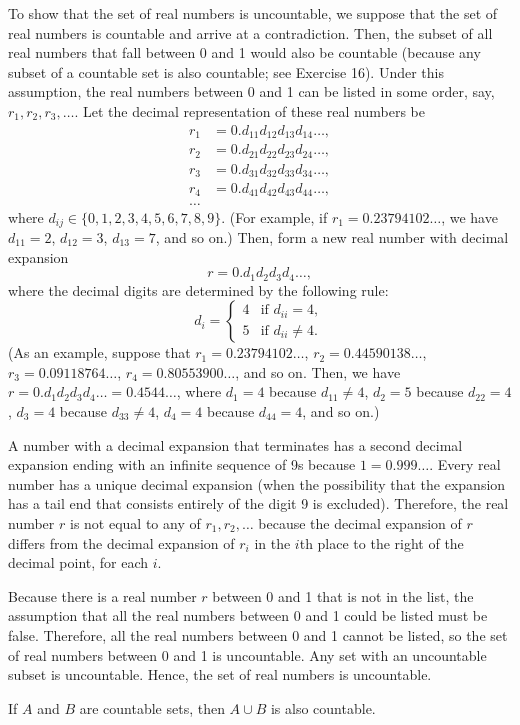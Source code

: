 \begin{thm}

To show that the set of real numbers is uncountable, we suppose that the set of real numbers is countable and arrive at a contradiction. Then, the subset of all real numbers that fall between 0 and 1 would also be countable (because any subset of a countable set is also countable; see Exercise 16). Under this assumption, the real numbers between 0 and 1 can be listed in some order, say, $r_1, r_2, r_3, \ldots$. Let the decimal representation of these real numbers be
\[
\begin{aligned}
    r_1 &= 0.d_{11}d_{12}d_{13}d_{14}\ldots, \\
    r_2 &= 0.d_{21}d_{22}d_{23}d_{24}\ldots, \\
    r_3 &= 0.d_{31}d_{32}d_{33}d_{34}\ldots, \\
    r_4 &= 0.d_{41}d_{42}d_{43}d_{44}\ldots, \\
    \ldots
\end{aligned}
\]
where $d_{ij} \in \{0, 1, 2, 3, 4, 5, 6, 7, 8, 9\}$. (For example, if $r_1 = 0.23794102\ldots$, we have $d_{11} = 2$, $d_{12} = 3$, $d_{13} = 7$, and so on.) Then, form a new real number with decimal expansion
\[
r = 0.d_1d_2d_3d_4\ldots,
\]
where the decimal digits are determined by the following rule:
\[
d_i =
\begin{cases}
    4 & \text{if } d_{ii} = 4, \\
    5 & \text{if } d_{ii} \neq 4.
\end{cases}
\]
(As an example, suppose that $r_1 = 0.23794102\ldots$, $r_2 = 0.44590138\ldots$, $r_3 = 0.09118764\ldots$, $r_4 = 0.80553900\ldots$, and so on. Then, we have $r = 0.d_1d_2d_3d_4\ldots = 0.4544\ldots$, where $d_1 = 4$ because $d_{11} \neq 4$, $d_2 = 5$ because $d_{22} = 4$, $d_3 = 4$ because $d_{33} \neq 4$, $d_4 = 4$ because $d_{44} = 4$, and so on.)

A number with a decimal expansion that terminates has a second decimal expansion ending with an infinite sequence of 9s because $1 = 0.999\ldots$. Every real number has a unique decimal expansion (when the possibility that the expansion has a tail end that consists entirely of the digit 9 is excluded). Therefore, the real number $r$ is not equal to any of $r_1, r_2, \ldots$ because the decimal expansion of $r$ differs from the decimal expansion of $r_i$ in the $i$th place to the right of the decimal point, for each $i$.

Because there is a real number $r$ between 0 and 1 that is not in the list, the assumption that all the real numbers between 0 and 1 could be listed must be false. Therefore, all the real numbers between 0 and 1 cannot be listed, so the set of real numbers between 0 and 1 is uncountable. Any set with an uncountable subset is uncountable. Hence, the set of real numbers is uncountable.
\end{thm}
\begin{thm}
If $A$ and $B$ are countable sets, then $A \cup B$ is also countable.

\end{thm}


